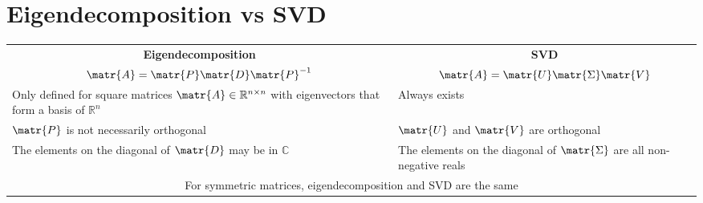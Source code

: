 \section{Eigendecomposition vs SVD}
\begin{center}
    \begin{tabular}{m{16em} | m{16em}}
        \hline
        \multicolumn{1}{c|}{\textbf{Eigendecomposition}} & \multicolumn{1}{c}{\textbf{SVD}} \\
        \multicolumn{1}{c|}{$\matr{A} = \matr{P}\matr{D}\matr{P}^{-1}$} & \multicolumn{1}{c}{$\matr{A}=\matr{U}\matr{\Sigma}\matr{V}$} \\
        \hline
        Only defined for square matrices $\matr{A} \in \mathbb{R}^{n \times n}$ with eigenvectors that form a basis of $\mathbb{R}^n$ 
        & Always exists \\
        \hline
        $\matr{P}$ is not necessarily orthogonal & $\matr{U}$ and $\matr{V}$ are orthogonal \\
        \hline
        The elements on the diagonal of $\matr{D}$ may be in $\mathbb{C}$ 
        & The elements on the diagonal of $\matr{\Sigma}$ are all non-negative reals \\
        \hline
        \multicolumn{2}{c}{For symmetric matrices, eigendecomposition and SVD are the same} \\
        \hline
    \end{tabular}
\end{center}
